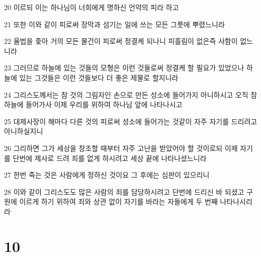 \par 20 이르되 이는 하나님이 너희에게 명하신 언약의 피라 하고
\par 21 또한 이와 같이 피로써 장막과 섬기는 일에 쓰는 모든 그릇에 뿌렸느니라
\par 22 율법을 좇아 거의 모든 물건이 피로써 정결케 되나니 피흘림이 없은즉 사함이 없느니라
\par 23 그러므로 하늘에 있는 것들의 모형은 이런 것들로써 정결케 할 필요가 있었으나 하늘에 있는 그것들은 이런 것들보다 더 좋은 제물로 할지니라
\par 24 그리스도께서는 참 것의 그림자인 손으로 만든 성소에 들어가지 아니하시고 오직 참 하늘에 들어가사 이제 우리를 위하여 하나님 앞에 나타나시고
\par 25 대제사장이 해마다 다른 것의 피로써 성소에 들어가는 것같이 자주 자기를 드리려고 아니하실지니
\par 26 그리하면 그가 세상을 창조할 때부터 자주 고난을 받았어야 할 것이로되 이제 자기를 단번에 제사로 드려 죄를 없게 하시려고 세상 끝에 나타나셨느니라
\par 27 한번 죽는 것은 사람에게 정하신 것이요 그 후에는 심판이 있으리니
\par 28 이와 같이 그리스도도 많은 사람의 죄를 담당하시려고 단번에 드리신 바 되셨고 구원에 이르게 하기 위하여 죄와 상관 없이 자기를 바라는 자들에게 두 번째 나타나시리라

\chapter{10}

